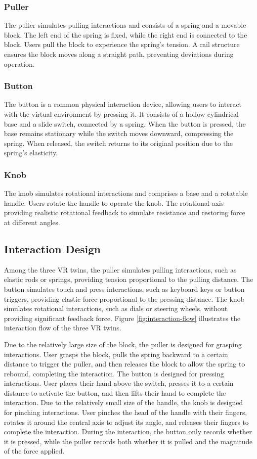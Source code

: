 \subsubsection{Puller}
The puller simulates pulling interactions and consists of a spring and a movable block. The left end of the spring is fixed, while the right end is connected to the block. Users pull the block to experience the spring's tension. A rail structure ensures the block moves along a straight path, preventing deviations during operation.

\subsubsection{Button}
The button is a common physical interaction device, allowing users to interact with the virtual environment by pressing it. It consists of a hollow cylindrical base and a slide switch, connected by a spring. When the button is pressed, the base remains stationary while the switch moves downward, compressing the spring. When released, the switch returns to its original position due to the spring's elasticity.

\subsubsection{Knob}
The knob simulates rotational interactions and comprises a base and a rotatable handle. Users rotate the handle to operate the knob. The rotational axis providing realistic rotational feedback to simulate resistance and restoring force at different angles.

\subsection{Interaction Design}
Among the three VR twins, the puller simulates pulling interactions, such as elastic rods or springs, providing tension proportional to the pulling distance. The button simulates touch and press interactions, such as keyboard keys or button triggers, providing elastic force proportional to the pressing distance. The knob simulates rotational interactions, such as dials or steering wheels, without providing significant feedback force. Figure \ref{fig:interaction-flow} illustrates the interaction flow of the three VR twins.

Due to the relatively large size of the block, the puller is designed for grasping interactions. User grasps the block, pulls the spring backward to a certain distance to trigger the puller, and then releases the block to allow the spring to rebound, completing the interaction. The button is designed for pressing interactions. User places their hand above the switch, presses it to a certain distance to activate the button, and then lifts their hand to complete the interaction. Due to the relatively small size of the handle, the knob is designed for pinching interactions. User pinches the head of the handle with their fingers, rotates it around the central axis to adjust its angle, and releases their fingers to complete the interaction. During the interaction, the button only records whether it is pressed, while the puller records both whether it is pulled and the magnitude of the force applied.